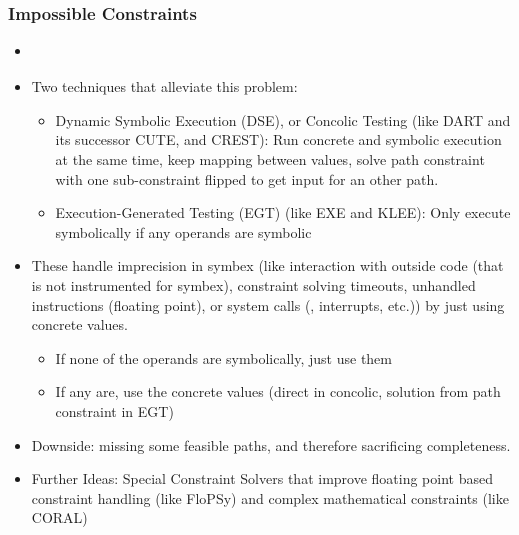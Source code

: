 \documentclass{article}
\begin{document}
\begin{multicols}{2}
    \subsubsection{Impossible Constraints}
    \begin{itemize}
        \item {}\cite{ReviewThreeDecades}
        \item Two techniques that alleviate this problem:
              \begin{itemize}
                  \item Dynamic Symbolic Execution (DSE), or Concolic Testing (like DART\cite{DART} and its successor CUTE\cite{CUTE}, and CREST\cite{CREST}): Run concrete and symbolic execution at the same time, keep mapping between values, solve path constraint with one sub-constraint flipped to get input for an other path. \cite{PreliminaryAssessment}
                  \item Execution-Generated Testing (EGT)\cite{EGT} (like EXE\cite{EXE} and KLEE\cite{KLEE}): Only execute symbolically if any operands are symbolic
              \end{itemize}
        \item These handle imprecision in symbex (like interaction with outside code (that is not instrumented for symbex), constraint solving timeouts, unhandled instructions (floating point), or system calls (, interrupts, etc.)) by just using concrete values.
              \begin{itemize}
                  \item If none of the operands are symbolically, just use them
                  \item If any are, use the concrete values (direct in concolic, solution from path constraint in EGT)
              \end{itemize}
        \item Downside: missing some feasible paths, and therefore sacrificing completeness.
        \item Further Ideas: Special Constraint Solvers that improve floating point based constraint handling (like FloPSy\cite{FloPSy}) and complex mathematical constraints (like CORAL\cite{CORAL})
    \end{itemize}


\end{multicols}
\end{document}
